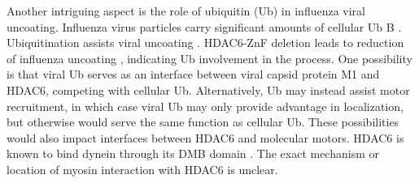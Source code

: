 Another intriguing aspect is the role of ubiquitin (Ub) in influenza viral uncoating. Influenza virus particles carry significant amounts of cellular Ub B \cite{hutchinson2014conserved}. Ubiquitination assists viral uncoating \cite{rudnicka2016ubiquitin}. HDAC6-ZnF deletion leads to reduction of influenza uncoating \cite{banerjee2014influenza}, indicating Ub involvement in the process. One possibility is that viral Ub serves as an interface between viral capsid protein M1 and HDAC6, competing with cellular Ub. Alternatively, Ub may instead assist motor recruitment, in which case viral Ub may only provide advantage in localization, but otherwise would serve the same function as cellular Ub. These possibilities would also impact interfaces between HDAC6 and molecular motors. HDAC6 is known to bind dynein through its DMB domain \cite{kawaguchi2003deacetylase}. The exact mechanism or location of myosin interaction with HDAC6 is unclear.
